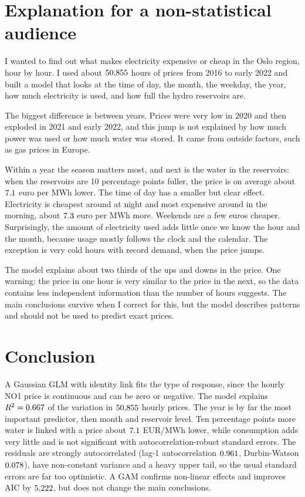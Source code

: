 \documentclass[12pt]{article}
\newcommand{\eur}{EUR/MWh}
\begin{document}
\section{Explanation for a non-statistical audience}\label{sec:plain}

I wanted to find out what makes electricity expensive or cheap in the Oslo region, hour by hour. I used about $50{,}855$ hours of prices from 2016 to early 2022 and built a model that looks at the time of day, the month, the weekday, the year, how much electricity is used, and how full the hydro reservoirs are.

The biggest difference is between years. Prices were very low in 2020 and then exploded in 2021 and early 2022, and this jump is not explained by how much power was used or how much water was stored. It came from outside factors, such as gas prices in Europe.

Within a year the season matters most, and next is the water in the reservoirs: when the reservoirs are 10 percentage points fuller, the price is on average about $7.1$ euro per MWh lower. The time of day has a smaller but clear effect. Electricity is cheapest around \hourMinAt{} at night and most expensive around \hourMaxAt{} in the morning, about $7.3$ euro per MWh more. Weekends are a few euros cheaper. Surprisingly, the amount of electricity used adds little once we know the hour and the month, because usage mostly follows the clock and the calendar. The exception is very cold hours with record demand, when the price jumps.

The model explains about two thirds of the ups and downs in the price. One warning: the price in one hour is very similar to the price in the next, so the data contains less independent information than the number of hours suggests. The main conclusions survive when I correct for this, but the model describes patterns and should not be used to predict exact prices.

\section{Conclusion}

A Gaussian GLM with identity link fits the type of response, since the hourly NO1 price is continuous and can be zero or negative. The model explains $R^2 = 0.667$ of the variation in $50{,}855$ hourly prices. The year is by far the most important predictor, then month and reservoir level. Ten percentage points more water is linked with a price about $7.1$ \eur{} lower, while consumption adds very little and is not significant with autocorrelation-robust standard errors. The residuals are strongly autocorrelated (lag-1 autocorrelation $0.961$, Durbin-Watson $0.078$), have non-constant variance and a heavy upper tail, so the usual standard errors are far too optimistic. A GAM confirms non-linear effects and improves AIC by $5{,}222$, but does not change the main conclusions.

\begingroup\sloppy
\printbibliography[heading=bibintoc, title={References}]
\endgroup
\end{document}
